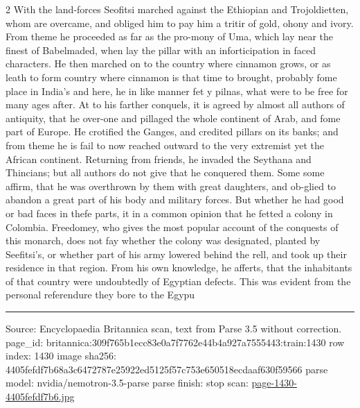 \documentclass[10pt]{article}
\begin{document}
\begin{multicols}{2}
With the land-forces Seofitsi marched against the Ethiopian and Trojoldietten, whom are overcame, and obliged him to pay him a tritir of gold, ohony and ivory. From theme he proceeded as far as the pro-mony of Uma, which lay near the finest of Babelmaded, when lay the pillar with an inforticipation in faced characters. He then marched on to the country where cinnamon grows, or as leath to form country where cinnamon is that time to brought, probably fome place in India’s and here, he in like manner fet y pilnas, what were to be free for many ages after. At to his farther conquels, it is agreed by almost all authors of antiquity, that he over-one and pillaged the whole continent of Arab, and fome part of Europe. He crotified the Ganges, and credited pillars on its banks; and from theme he is fail to now reached outward to the very extremist yet the African continent. Returning from friends, he invaded the Seythana and Thincians; but all authors do not give that he conquered them. Some some affirm, that he was overthrown by them with great daughters, and ob-glied to abandon a great part of his body and military forces. But whether he had good or bad faces in thefe parts, it in a common opinion that he fetted a colony in Colombia. Freedomey, who gives the most popular account of the conquests of this monarch, does not fay whether the colony was designated, planted by Seefitsi's, or whether part of his army lowered behind the rell, and took up their residence in that region. From his own knowledge, he afferts, that the inhabitants of that country were undoubtedly of Egyptian defects. This was evident from the personal referendure they bore to the Egypu

\end{multicols}
\vfill\par\noindent\rule{\linewidth}{0.4pt}\par
{\scriptsize\color{gray}\noindent Source: Encyclopaedia Britannica scan, text from Parse 3.5 without correction. page\_id: britannica:309f765b1ecc83e0a7f7762e44b4a927a7555443:train:1430 \quad row index: 1430 \quad image sha256: 4405fefdf7b68a3c6472787e25922ed5125f57c753e650518ecdaaf630f59566 \quad parse model: nvidia/nemotron-3.5-parse \quad parse finish: stop \quad scan: \href{../scans/page-1430-4405fefdf7b6.jpg}{page-1430-4405fefdf7b6.jpg}\par}
\end{document}
